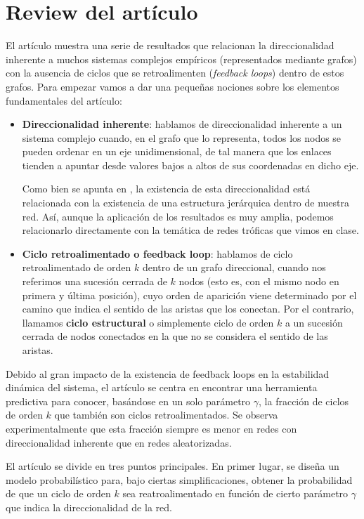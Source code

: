 \documentclass[1p]{elsarticle}
\begin{document}
\section{Review del artículo}
El artículo muestra una serie de resultados que relacionan la direccionalidad inherente a muchos sistemas complejos empíricos (representados mediante grafos) con la ausencia de ciclos que se retroalimenten (\textit{feedback loops}) dentro de estos grafos. 
Para empezar vamos a dar una pequeñas nociones sobre los elementos fundamentales del artículo:
\begin{itemize}
	\item \textbf{Direccionalidad inherente}: hablamos de direccionalidad inherente a un sistema complejo cuando, en el grafo que lo representa, todos los nodos se pueden ordenar en un eje unidimensional, de tal manera que los enlaces tienden a apuntar desde valores bajos a altos de sus coordenadas en dicho eje. 
	
	Como bien se apunta en \cite{arti}, la existencia de esta direccionalidad está relacionada con la existencia de una estructura jerárquica dentro de nuestra red. Así, aunque la aplicación de los resultados es muy amplia, podemos relacionarlo directamente con la temática de redes tróficas que vimos en clase. 

	\item \textbf{Ciclo retroalimentado o feedback loop}: hablamos de ciclo retroalimentado de orden $k$ dentro de un grafo direccional, cuando nos referimos una sucesión cerrada de $k$ nodos (esto es, con el mismo nodo en primera y última posición), cuyo orden de aparición viene determinado por el camino que indica el sentido de las aristas que los conectan.
        Por el contrario, llamamos \textbf{ciclo estructural} o simplemente ciclo de orden $k$ a un sucesión cerrada de nodos conectados en la que no se considera el sentido de las aristas.
\end{itemize}


    Debido al gran impacto de la existencia de feedback loops en la estabilidad dinámica del sistema, el artículo se centra en encontrar una herramienta predictiva para conocer, basándose en un solo parámetro $\gamma$, la fracción de ciclos de orden $k$ que también son ciclos retroalimentados. Se observa experimentalmente que esta fracción siempre es menor en redes con direccionalidad inherente que en redes aleatorizadas.

    El artículo se divide en tres puntos principales.
    En primer lugar, se diseña un modelo probabilístico para, bajo ciertas simplificaciones, obtener la probabilidad de que un ciclo de orden $k$ sea reatroalimentado en función de cierto parámetro $\gamma$ que indica la direccionalidad de la red.
\end{document}
